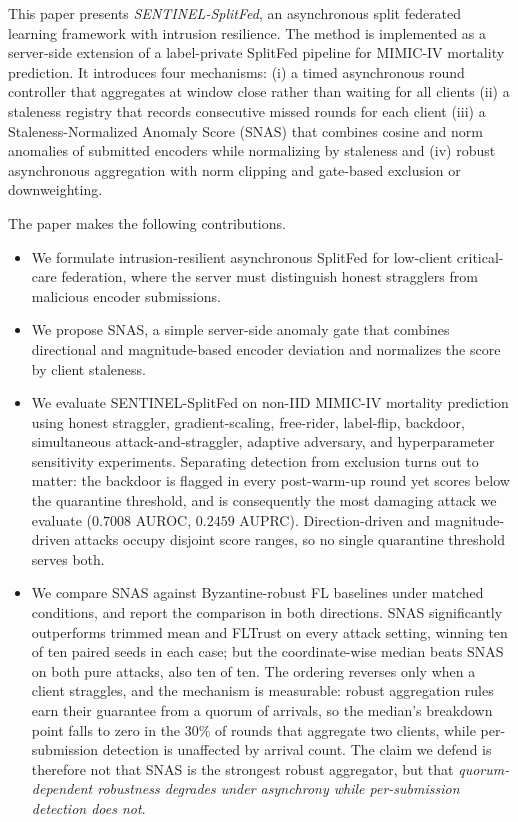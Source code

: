 \documentclass[pdflatex,sn-mathphys-num]{sn-jnl}
\begin{document}
This paper presents \emph{SENTINEL-SplitFed}, an asynchronous split federated learning framework with intrusion resilience. The method is implemented as a server-side extension of a label-private SplitFed pipeline for MIMIC-IV mortality prediction. It introduces four mechanisms: (i) a timed asynchronous round controller that aggregates at window close rather than waiting for all clients (ii) a staleness registry that records consecutive missed rounds for each client (iii) a Staleness-Normalized Anomaly Score (SNAS) that combines cosine and norm anomalies of submitted encoders while normalizing by staleness and (iv) robust asynchronous aggregation with norm clipping and gate-based exclusion or downweighting.

The paper makes the following contributions.
\begin{itemize}
    \item We formulate intrusion-resilient asynchronous SplitFed for low-client critical-care federation, where the server must distinguish honest stragglers from malicious encoder submissions.
    \item We propose SNAS, a simple server-side anomaly gate that combines directional and magnitude-based encoder deviation and normalizes the score by client staleness.
    \item We evaluate SENTINEL-SplitFed on non-IID MIMIC-IV mortality prediction using honest straggler, gradient-scaling, free-rider, label-flip, backdoor, simultaneous attack-and-straggler, adaptive adversary, and hyperparameter sensitivity experiments. Separating detection from exclusion turns out to matter: the backdoor is flagged in every post-warm-up round yet scores below the quarantine threshold, and is consequently the most damaging attack we evaluate ($0.7008$ AUROC, $0.2459$ AUPRC). Direction-driven and magnitude-driven attacks occupy disjoint score ranges, so no single quarantine threshold serves both.
    \item We compare SNAS against Byzantine-robust FL baselines under matched conditions, and report the comparison in both directions. SNAS significantly outperforms trimmed mean and FLTrust on every attack setting, winning ten of ten paired seeds in each case; but the coordinate-wise median beats SNAS on both pure attacks, also ten of ten. The ordering reverses only when a client straggles, and the mechanism is measurable: robust aggregation rules earn their guarantee from a quorum of arrivals, so the median's breakdown point falls to zero in the $30\%$ of rounds that aggregate two clients, while per-submission detection is unaffected by arrival count. The claim we defend is therefore not that SNAS is the strongest robust aggregator, but that \emph{quorum-dependent robustness degrades under asynchrony while per-submission detection does not}.

\end{itemize}
\end{document}
